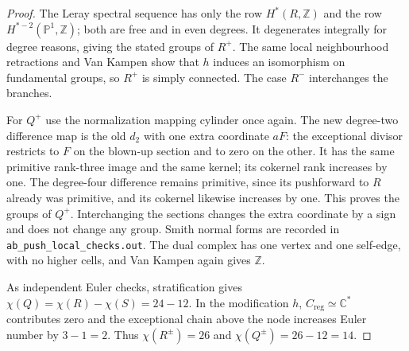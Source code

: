 \begin{proof}
The Leray spectral sequence has only the row $H^*(R,\mathbb Z)$
and the row $H^{*-2}(\mathbb P^1,\mathbb Z)$; both are free
and in even degrees. It degenerates integrally for degree
reasons, giving the stated groups of $R^+$. The same local
neighbourhood retractions and Van Kampen show that $h$ induces
an isomorphism on fundamental groups, so $R^+$ is simply
connected. The case $R^-$ interchanges the branches.

For $Q^+$ use the normalization mapping cylinder once again.
The new degree-two difference map is the old $d_2$ with
one extra coordinate $aF$: the exceptional divisor restricts
to $F$ on the blown-up section and to zero on the other.
It has the same primitive rank-three image and the same
kernel; its cokernel rank increases by one. The degree-four
difference remains primitive, since its pushforward to $R$
already was primitive, and its cokernel likewise increases
by one. This proves the groups of $Q^+$. Interchanging the
sections changes the extra coordinate by a sign and does
not change any group. Smith normal forms are recorded in
\texttt{ab\_push\_local\_checks.out}. The dual complex has
one vertex and one self-edge, with no higher cells, and
Van Kampen again gives $\mathbb Z$.

As independent Euler checks, stratification gives
$\chi(Q)=\chi(R)-\chi(S)=24-12$. In the modification $h$,
$C_{\mathrm{reg}}\simeq\mathbb C^*$ contributes zero and
the exceptional chain above the node increases Euler number
by $3-1=2$. Thus $\chi(R^\pm)=26$ and
$\chi(Q^\pm)=26-12=14$.
\end{proof}


